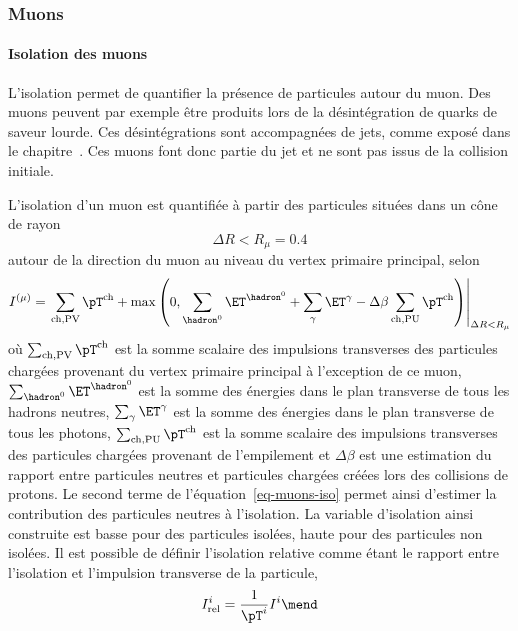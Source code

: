 \subsubsection{Muons}
\paragraph{Isolation des muons}
L'isolation permet de quantifier la présence de particules autour du muon.
Des muons peuvent par exemple être produits lors de la désintégration de quarks de saveur lourde.
Ces désintégrations sont accompagnées de jets, comme exposé dans le chapitre~.
Ces muons font donc partie du jet et ne sont pas issus de la collision initiale.
\par
L'isolation d'un muon est quantifiée à partir des particules situées dans un cône de rayon
\begin{equation}
\Delta R < R_\mu=\num{0.4}
\end{equation}
autour de la direction du muon au niveau du vertex primaire principal,
selon
\begin{equation}
I^{(\mu)}
=
\left.
\sum_{\text{ch},\text{PV}} \pT^{\text{ch}}
+
\max\left(
0
,
\sum_{\hadron^0}\ET^{\hadron^0}
+
\sum_{\gamma}\ET^{\gamma}
- \Delta\beta
\sum_{\text{ch},\text{PU}} \pT^{\text{ch}}
\right)
\right|_{\Delta R < R_\mu}
\label{eq-muons-iso}
\end{equation}
où
$\sum_{\text{ch},\text{PV}} \pT^{\text{ch}}$ est la somme scalaire des impulsions transverses des particules chargées provenant du vertex primaire principal à l'exception de ce muon,
$\sum_{\hadron^0}\ET^{\hadron^0}$ est la somme des énergies dans le plan transverse de tous les hadrons neutres,
$\sum_{\gamma}\ET^{\gamma}$ est la somme des énergies dans le plan transverse de tous les photons,
$\sum_{\text{ch},\text{PU}} \pT^{\text{ch}}$ est la somme scalaire des impulsions transverses des particules chargées provenant de l'empilement et
$\Delta\beta$ est une estimation du rapport entre particules neutres et particules chargées créées lors des collisions de protons.
Le second terme de l'équation~\eqref{eq-muons-iso} permet ainsi d'estimer la contribution des particules neutres à l'isolation.
La variable d'isolation ainsi construite est basse pour des particules isolées, haute pour des particules non isolées.
Il est possible de définir l'isolation relative comme étant le rapport entre l'isolation et l'impulsion transverse de la particule,
\begin{equation}
I_\text{rel}^{i}
=
\frac{1}{\pT^{i}}
I^{i}
\mend
\label{eq-muons-reliso}
\end{equation}
